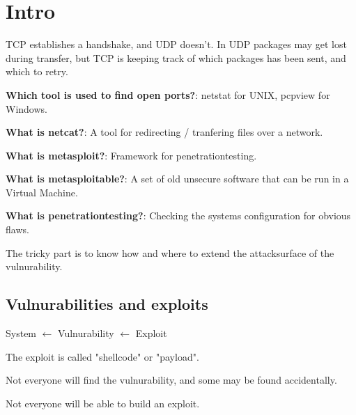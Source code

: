 \section{Intro}
\begin{flushleft}
TCP establishes a handshake, and UDP doesn't.
In UDP packages may get lost during transfer, but TCP is keeping track of which packages has been sent, and which to retry.

\textbf{Which tool is used to find open ports?}: netstat for UNIX, pcpview for Windows.

\textbf{What is netcat?}: A tool for redirecting / tranfering files over a network.

\textbf{What is metasploit?}: Framework for penetrationtesting.

\textbf{What is metasploitable?}: A set of old unsecure software that can be run in a Virtual Machine.

\textbf{What is penetrationtesting?}: Checking the systems configuration for obvious flaws.

The tricky part is to know how and where to extend the attacksurface of the vulnurability.

\subsection{Vulnurabilities and exploits}
System $\leftarrow$ Vulnurability $\leftarrow$ Exploit

The exploit is called "shellcode" or "payload".

Not everyone will find the vulnurability, and some may be found accidentally.

Not everyone will be able to build an exploit.
\end{flushleft}

